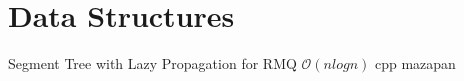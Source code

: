 \section{Data Structures}

{Segment Tree with Lazy Propagation for RMQ}
{$\mathcal{O}(nlogn)$}
{cpp}{}
{mazapan}

